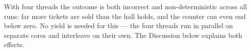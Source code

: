
With four threads the outcome is both incorrect and non-deterministic across
all runs: far more tickets are sold than the hall holds, and the counter can
even end below zero. No yield is needed for this --- the four threads run in
parallel on separate cores and interleave on their own. The Discussion below
explains both effects.
